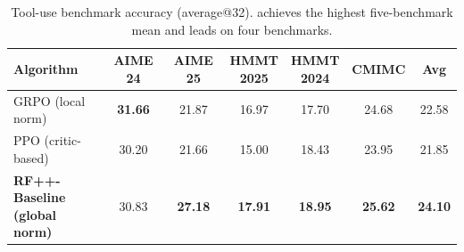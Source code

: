 \begin{table}[htb]
    \small
\centering
\caption{Tool-use benchmark accuracy (average@32). \varn achieves the highest five-benchmark mean and leads on four benchmarks.}
\label{tab:performance_comparison_main}
\setlength{\tabcolsep}{2.5pt} %
\begin{tabular}{l|ccccc|c}
\toprule
\textbf{Algorithm} & AIME 24 & AIME 25 & \shortstack{HMMT\\2025} & \shortstack{HMMT\\2024} & CMIMC & \textbf{Avg} \\
\midrule
GRPO (local norm) & \textbf{31.66} & 21.87 & 16.97 & 17.70 & 24.68 & 22.58 \\
PPO (critic-based) & 30.20 & 21.66 & 15.00 & 18.43 & 23.95 & 21.85 \\
\shortstack[l]{\textbf{RF++-Baseline}\\\textbf{(global norm)}} & 30.83 & \textbf{27.18} & \textbf{17.91} & \textbf{18.95} & \textbf{25.62} & \textbf{24.10} \\
\bottomrule
\end{tabular}

\end{table}
